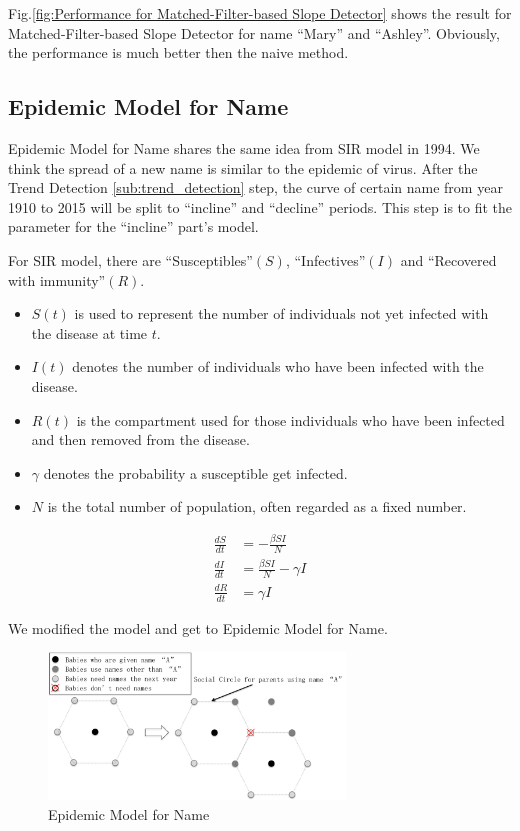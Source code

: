 \documentclass[journal]{IEEEtran}
\begin{document}
Fig.\ref{fig:Performance for Matched-Filter-based Slope Detector} shows the result for Matched-Filter-based Slope Detector for name ``Mary'' and ``Ashley''. Obviously, the performance is much better then the naive method. 


\subsection{Epidemic Model for Name} %
\label{sub:Epidemic Model for Name}
Epidemic Model for Name shares the same idea from SIR model \cite{Epidemic_Model_SIR} in 1994. We think the spread of a new name is similar to the epidemic of virus. 
After the Trend Detection \ref{sub:trend_detection} step, the curve of certain name from year 1910 to 2015 will be split to ``incline'' and ``decline'' periods. This step is to fit the parameter for the ``incline'' part's model. 

For SIR model, there are ``Susceptibles''$(S)$, ``Infectives''$(I)$ and ``Recovered with immunity''$(R)$.
\begin{itemize}
	\item $S(t)$ is used to represent the number of individuals not yet infected with the disease at time $t$.\\
	\item $I(t)$ denotes the number of individuals who have been infected with the disease.\\
	\item $R(t)$ is the compartment used for those individuals who have been infected and then removed from the disease.\\
	\item $\gamma$ denotes the probability a susceptible get infected.\\
	\item $N$ is the total number of population, often regarded as a fixed number.
\end{itemize}
\begin{align}
	\frac{dS}{dt} &= -\frac{\beta SI}{N}\\
	\frac{dI}{dt} &= \frac{\beta SI}{N} - \gamma I\\
	\frac{dR}{dt} &= \gamma I
\end{align}

We modified the model and get to Epidemic Model for Name.
\begin{figure}[ht]
	\centering
	\includegraphics[width = 3.1in]{figure/EpidemicModelDiagram.png}
	\caption{Epidemic Model for Name}
	\label{fig:Epidemic Model for name}
\end{figure}
\end{document}
